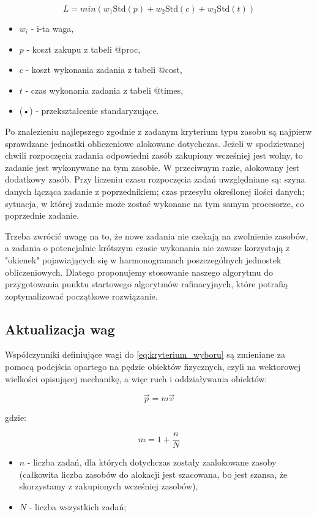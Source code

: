 \documentclass[a4paper,11pt]{article}
\begin{document}
\begin{equation}
    L = min({w_1}\text{Std}(p) + {w_2}\text{Std}(c) + {w_3}\text{Std}(t))
    \label{eq:kryterium_wyboru}
\end{equation}
\begin{itemize}
\item \(w_i\) - i-ta waga,
\item \(p\) - koszt zakupu z tabeli @proc,
\item \(c\) - koszt wykonania zadania z tabeli @cost,
\item \(t\) - czas wykonania zadania z tabeli @times,
\item {}(•) - przekształcenie standaryzujące.
\end{itemize}

Po znalezieniu najlepszego zgodnie z zadanym kryterium typu zasobu są najpierw
sprawdzane jednostki obliczeniowe alokowane dotychczas. Jeżeli w spodziewanej
chwili rozpoczęcia zadania odpowiedni zasób zakupiony wcześniej jest wolny, to
zadanie jest wykonywane na tym zasobie. W przeciwnym razie, alokowany jest
dodatkowy zasób. Przy liczeniu czasu rozpoczęcia zadań uwzględniane są:
szyna danych łącząca zadanie z poprzednikiem; czas przesyłu określonej ilości
danych; sytuacja, w której zadanie może zostać wykonane na tym samym procesorze,
co poprzednie zadanie.

Trzeba zwrócić uwagę na to, że nowe zadania nie czekają na zwolnienie zasobów, a
zadania o potencjalnie krótszym czasie wykonania nie zawsze korzystają z
"okienek" pojawiających się w harmonogramach poszczególnych jednostek 
obliczeniowych. Dlatego proponujemy stosowanie naszego algorytmu do przygotowania punktu startowego algorytmów rafinacyjnych, które potrafią zoptymalizować początkowe rozwiązanie.


\subsection{Aktualizacja wag}
Współczynniki definiujące wagi do \ref{eq:kryterium_wyboru} są zmieniane
za pomocą podejścia opartego na pędzie obiektów fizycznych, czyli na wektorowej
wielkości opisującej mechanikę, a więc ruch i oddziaływania obiektów:

\begin{equation}
    \vec{p} = m \vec{v}
    \label{eq:pęd}
\end{equation}

gdzie:

\begin{equation*}
    m = 1 + \frac{n}{N}
\end{equation*}
\begin{itemize}
    \item \(n\) - liczba zadań, dla których dotychczas zostały zaalokowane
    zasoby (całkowita liczba zasobów do alokacji jest szacowana, bo jest szansa,
    że skorzystamy z zakupionych wcześniej zasobów),
    \item \(N\) - liczba wszystkich zadań;
\end{itemize}
\end{document}
